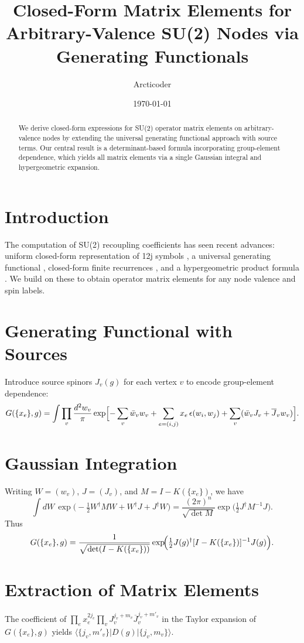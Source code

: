 \documentclass{article}
\title{Closed-Form Matrix Elements for Arbitrary-Valence SU(2) Nodes via Generating Functionals}
\author{Arcticoder}
\date{\today}
\begin{document}
\maketitle

\begin{abstract}
We derive closed-form expressions for SU(2) operator matrix elements on arbitrary-valence nodes by extending the universal generating functional approach with source terms. Our central result is a determinant-based formula incorporating group-element dependence, which yields all matrix elements via a single Gaussian integral and hypergeometric expansion.
\end{abstract}

\section{Introduction}
The computation of SU(2) recoupling coefficients has seen recent advances:  
uniform closed-form representation of 12j symbols \cite{Uniform12j}, a universal generating functional \cite{GenFun}, closed-form finite recurrences \cite{Recurrences}, and a hypergeometric product formula \cite{ProductFormula}. We build on these to obtain operator matrix elements for any node valence and spin labels.

\section{Generating Functional with Sources}
Introduce source spinors \(J_v(g)\) for each vertex \(v\) to encode group-element dependence:
\[
G(\{x_e\},g)
=\int\prod_v\frac{d^2w_v}{\pi}
\exp\Bigl[
-\sum_v\bar w_v w_v
+\sum_{e=(i,j)}x_e\,\epsilon(w_i,w_j)
+\sum_v(\bar w_v J_v+\overline J_v w_v)
\Bigr].
\]

\section{Gaussian Integration}
Writing \(W=(w_v)\), \(J=(J_v)\), and \(M=I-K(\{x_e\})\), we have
\[
\int dW\,\exp\bigl(-\tfrac12W^\dagger M W + W^\dagger J + J^\dagger W\bigr)
=\frac{(2\pi)^n}{\sqrt{\det M}}
\exp\!\bigl(\tfrac12 J^\dagger M^{-1}J\bigr).
\]
Thus
\[
G(\{x_e\},g)
=\frac{1}{\sqrt{\det(I-K(\{x_e\}))}}
\exp\!\Bigl(\tfrac12 J(g)^\dagger[I-K(\{x_e\})]^{-1}J(g)\Bigr).
\]

\section{Extraction of Matrix Elements}
The coefficient of \(\prod_e x_e^{2j_e}\prod_vJ_v^{j_v+m_v}\overline J_v^{j_v+m'_v}\)
in the Taylor expansion of \(G(\{x_e\},g)\) yields
\(\langle\{j_v,m'_v\}|D(g)|\{j_v,m_v\}\rangle\).
\end{document}
